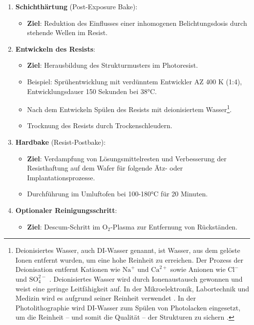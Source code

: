 \documentclass{article} %
\begin{document}
\begin{enumerate}
    \item \textbf{Schichthärtung} (Post-Exposure Bake):
    \begin{itemize}
        \item \textbf{Ziel}: Reduktion des Einflusses einer inhomogenen Belichtungsdosis durch stehende Wellen im Resist.
    \end{itemize}

    \item \textbf{Entwickeln des Resists}:
    \begin{itemize}
        \item \textbf{Ziel}: Herausbildung des Strukturmusters im Photoresist.
        \item Beispiel: Sprühentwicklung mit verdünntem Entwickler AZ 400 K (1:4), Entwicklungsdauer 150 Sekunden bei 38°C.
        \item Nach dem Entwickeln Spülen des Resists mit deionisiertem Wasser\footnote{Deionisiertes Wasser, auch DI-Wasser genannt, ist Wasser, aus dem gelöste Ionen entfernt wurden, um eine hohe Reinheit zu erreichen. Der Prozess der Deionisation entfernt Kationen wie $\mathrm{Na}^+$ und $\mathrm{Ca}^{2+}$ sowie Anionen wie $\mathrm{Cl}^-$ und $\mathrm{SO}_4^{2-}$ \cite{swatchuk2008, weast2004}. Deionisiertes Wasser wird durch Ionenaustausch gewonnen und weist eine geringe Leitfähigkeit auf. In der Mikroelektronik, Labortechnik und Medizin wird es aufgrund seiner Reinheit verwendet \cite{handbook2007}. In der Photolithographie wird DI-Wasser zum Spülen von Photolacken eingesetzt, um die Reinheit -- und somit die Qualität --  der Strukturen zu sichern \cite{peeters1994}.}.    
        \item Trocknung des Resists durch Trockenschleudern.
    \end{itemize}

    \item \textbf{Hardbake} (Resist-Postbake):
    \begin{itemize}
        \item \textbf{Ziel}: Verdampfung von Lösungsmittelresten und Verbesserung der Resisthaftung auf dem Wafer für folgende Ätz- oder Implantationsprozesse.
        \item Durchführung im Umluftofen bei 100-180°C für 20 Minuten.
    \end{itemize}

    \item \textbf{Optionaler Reinigungsschritt}:
    \begin{itemize}
        \item \textbf{Ziel}: Descum-Schritt im $\mathrm{O}_2$-Plasma zur Entfernung von Rückständen.
    \end{itemize}


\end{enumerate}
\end{document}
